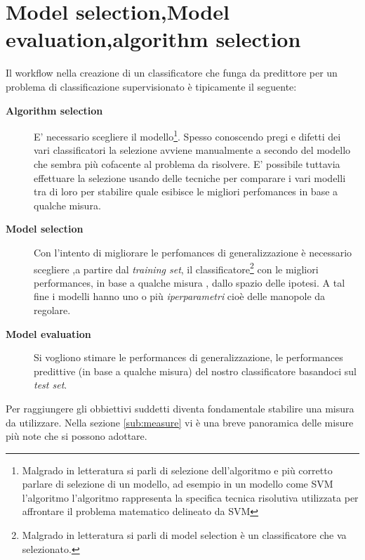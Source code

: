 \section[Tecniche selezione class.]{Model selection,Model evaluation,algorithm selection}
Il workflow nella creazione di un classificatore che funga da predittore per un problema di classificazione supervisionato è tipicamente il seguente:
\begin{description}
\item[\textbf{Algorithm selection}] E' necessario scegliere il modello\footnote{Malgrado in letteratura si parli di selezione dell'algoritmo e più corretto parlare di selezione di un modello, ad esempio in un modello come \ac{SVM} l'algoritmo l'algoritmo rappresenta la specifica tecnica risolutiva utilizzata per affrontare il problema matematico delineato da \ac{SVM}}. Spesso conoscendo pregi e difetti dei vari classificatori la selezione avviene manualmente a secondo del modello che sembra più cofacente al problema da risolvere. E' possibile tuttavia effettuare la selezione usando delle tecniche per comparare i vari modelli tra di loro per stabilire quale esibisce le migliori perfomances in base a qualche misura.
\item[\textbf{Model selection}] Con l'intento di migliorare le perfomances di generalizzazione è necessario scegliere ,a partire dal \textit{training set}, il classificatore\footnote{Malgrado in letteratura si parli di model selection è un classificatore che va selezionato.} con le migliori performances, in base a qualche misura , dallo spazio delle ipotesi. A tal fine  i modelli hanno uno o più \textit{iperparametri} cioè delle manopole da regolare.
\item[\textbf{Model evaluation}] Si vogliono stimare le performances di generalizzazione, le performances predittive (in base a qualche misura) del nostro classificatore basandoci sul \textit{test set}.
\end{description}
Per raggiungere gli obbiettivi suddetti diventa fondamentale stabilire una misura da utilizzare. Nella sezione \ref{sub:measure} vi è una breve panoramica delle misure più note che si possono adottare.

